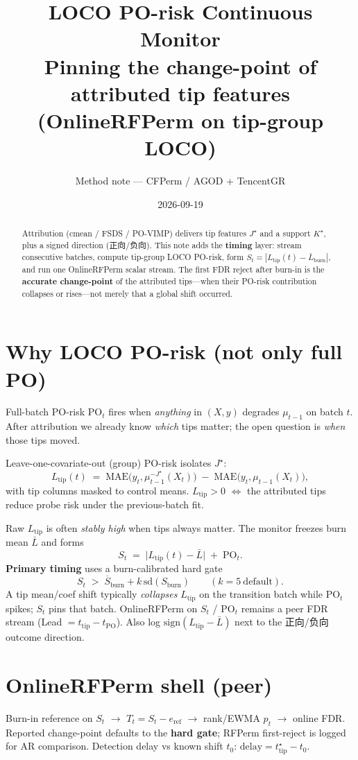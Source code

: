 \documentclass[11pt]{article}
\title{\textbf{LOCO PO-risk Continuous Monitor}\\
\large Pinning the change-point of attributed tip features\\
\large (OnlineRFPerm on tip-group LOCO)}
\author{Method note --- CFPerm / AGOD + TencentGR}
\date{2026-09-19}
\newcommand{\Jstar}{J^\star}
\begin{document}
\maketitle

\begin{abstract}
Attribution (cmean / FSDS / PO-VIMP) delivers tip features $\Jstar$ and
a support $K^\star$, plus a signed direction (正向/负向).
This note adds the \textbf{timing} layer: stream consecutive batches,
compute tip-group LOCO PO-risk, form
$S_t=|L_{\mathrm{tip}}(t)-\bar L_{\mathrm{burn}}|$, and run one
OnlineRFPerm scalar stream. The first FDR reject after burn-in is the
\textbf{accurate change-point} of the attributed tips---when their
PO-risk contribution collapses or rises---not merely that a global
shift occurred.
\end{abstract}

\section{Why LOCO PO-risk (not only full PO)}
Full-batch PO-risk $\mathrm{PO}_t$ fires when \emph{anything} in
$(X,y)$ degrades $\mu_{t-1}$ on batch $t$.
After attribution we already know \emph{which} tips matter; the
open question is \emph{when} those tips moved.

Leave-one-covariate-out (group) PO-risk isolates $\Jstar$:
\[
  L_{\mathrm{tip}}(t)
  \;=\;
  \mathrm{MAE}\!\big(y_t,\mu_{t-1}^{-\Jstar}(X_t)\big)
  \;-\;
  \mathrm{MAE}\!\big(y_t,\mu_{t-1}(X_t)\big),
\]
with tip columns masked to control means.
$L_{\mathrm{tip}}>0$ $\Leftrightarrow$ the attributed tips reduce probe risk
under the previous-batch fit.

Raw $L_{\mathrm{tip}}$ is often \emph{stably high} when tips always matter.
The monitor freezes burn mean $\bar L$ and forms
\[
  S_t \;=\; \bigl|L_{\mathrm{tip}}(t)-\bar L\bigr| \;+\; \mathrm{PO}_t.
\]
\textbf{Primary timing} uses a burn-calibrated hard gate
\[
  S_t \;>\; \overline{S}_{\mathrm{burn}} + k\,\mathrm{sd}(S_{\mathrm{burn}})
  \qquad (k{=}5\ \mathrm{default}).
\]
A tip mean/coef shift typically \emph{collapses} $L_{\mathrm{tip}}$ on the
transition batch while $\mathrm{PO}_t$ spikes; $S_t$ pins that batch.
OnlineRFPerm on $S_t$ / $\mathrm{PO}_t$ remains a peer FDR stream
(Lead $= t_{\mathrm{tip}}-t_{\mathrm{PO}}$).
Also log $\mathrm{sign}(L_{\mathrm{tip}}-\bar L)$ next to the
正向/负向 outcome direction.

\section{OnlineRFPerm shell (peer)}
Burn-in reference on $S_t$ $\to$ $T_t=S_t-e_{\mathrm{ref}}$ $\to$
rank/EWMA $p_t$ $\to$ online FDR.
Reported change-point defaults to the \textbf{hard gate}; RFPerm
first-reject is logged for AR comparison.
Detection delay vs known shift $t_0$:
$\mathrm{delay}=t^\star_{\mathrm{tip}}-t_0$.
\end{document}
